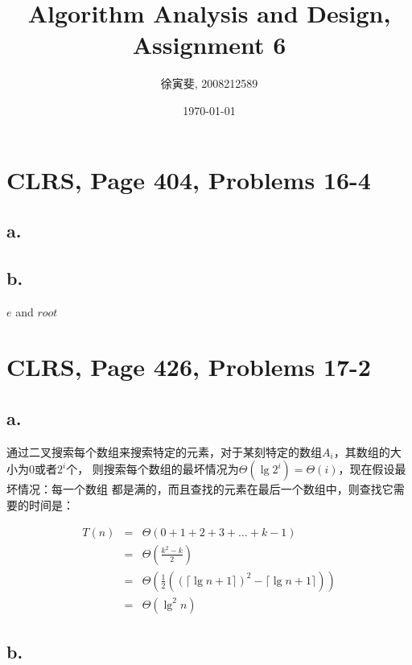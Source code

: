 \documentclass{article}
\begin{document}
\begin{CJK}{UTF8}{gbsn}
\title{Algorithm Analysis and Design, Assignment 6}
\author{徐寅斐, 2008212589}
\date{\today}
\maketitle

\section{CLRS, Page 404, Problems 16-4}

\subsection*{a.}

\subsection*{b.}

\begin{codebox}
\li \Return $e$ and $root$
\end{codebox}

\section{CLRS, Page 426, Problems 17-2}
\subsection*{a.}

通过二叉搜索每个数组来搜索特定的元素，对于某刻特定的数组$A_i$，其数组的大小为0或者$2^i$个，
则搜索每个数组的最坏情况为$\Theta(\lg{2^i}) = \Theta(i)$，现在假设最坏情况：每一个数组
都是满的，而且查找的元素在最后一个数组中，则查找它需要的时间是：

\begin{eqnarray*}
T(n)&=& \Theta(0+1+2+3+ \ldots + k-1)\\
 &=& \Theta(\frac{k^2 - k}{2})\\
 &=& \Theta(\frac{1}{2}((\lceil \lg {n+1}\rceil)^2 - \lceil \lg {n+1}\rceil))\\
 &=& \Theta(\lg ^2 n)
\end{eqnarray*}

\subsection*{b.}


\end{CJK}
\end{document}
